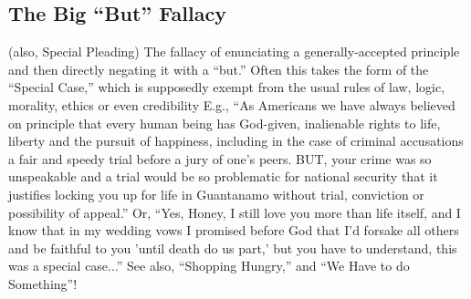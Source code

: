 \documentclass[10pt,a4paper,british]{article}
\begin{document}
\begin{multicols}{2}
	\subsection{The Big ``But'' Fallacy} (also, Special Pleading)  The fallacy
	of enunciating a generally{-}accepted principle and then directly negating
	it with a ``but.'' Often this takes the form of the ``Special Case,'' which
	is supposedly exempt from the usual rules of law, logic, morality, ethics
	or even credibility  E.g., ``As Americans we have always believed on
	principle that every human being has God{-}given, inalienable rights to
	life, liberty and the pursuit of happiness, including in the case of
	criminal accusations a fair and speedy trial before a jury of one's peers.
	BUT, your crime was so unspeakable and a trial would be so problematic for
	national security that it justifies locking you up for life in Guantanamo
	without trial, conviction or possibility of appeal.''  Or, ``Yes, Honey, I
	still love you more than life itself, and I know that in my wedding vows I
	promised before God that I'd forsake all others and be faithful to you
	'until death do us part,' but you have to understand, this was a special
	case...''  See also, ``Shopping Hungry,'' and ``We Have to do Something''!


\end{multicols}
\end{document}
